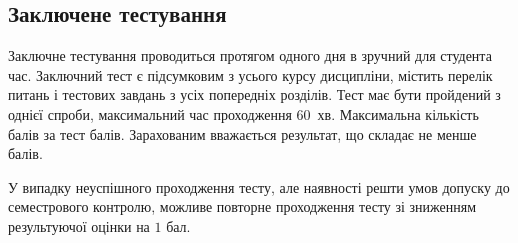 \documentclass{Syllabus}
\begin{document}
%
%
%

\subsection*{Заключене тестування}

Заключне тестування проводиться протягом одного дня в зручний для студента час. Заключний тест є підсумковим з усього курсу дисципліни, містить перелік питань і тестових завдань з усіх попередніх розділів. Тест має бути пройдений з однієї спроби, максимальний час проходження $60$~хв. Максимальна кількість балів за тест \testBal{} балів. Зарахованим вважається результат, що складає не менше  балів.

У випадку неуспішного проходження тесту, але наявності решти умов допуску до семестрового контролю, можливе повторне проходження тесту зі зниженням результуючої  оцінки на $1$ бал.
\end{document}
